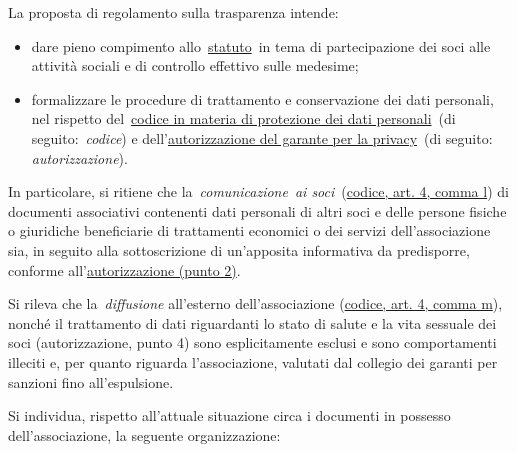 La proposta di regolamento sulla trasparenza intende:

\begin{itemize}
    \item
        dare pieno compimento
        allo~\href{http://www.alumniscuolagalileiana.it/wp-content/uploads/2017/03/Statuto-Alumni-SGSS.pdf}{statuto}~in
        tema di partecipazione dei soci alle attività sociali e di controllo
        effettivo sulle medesime;
    \item
        formalizzare le procedure di trattamento e conservazione dei dati
        personali, nel rispetto
        del~\href{http://www.garanteprivacy.it/web/guest/home/docweb/-/docweb-display/docweb/1311248}{codice
        in materia di protezione dei dati personali}~(di
        seguito:~\emph{codice}) e
        dell'\href{http://garanteprivacy.it/web/guest/home/docweb/-/docweb-display/docweb/5803310}{autorizzazione
        del garante per la privacy}~(di seguito: \emph{autorizzazione}).
\end{itemize}

In particolare, si ritiene che la~\emph{comunicazione}~\emph{ai
soci}~(\href{http://www.garanteprivacy.it/web/guest/home/docweb/-/docweb-display/docweb/1311248}{codice,
art. 4, comma l}) di documenti associativi contenenti dati personali di
altri soci e delle persone fisiche o giuridiche beneficiarie di
trattamenti economici o dei servizi dell'associazione sia, in seguito
alla sottoscrizione di un'apposita informativa da predisporre, conforme
all'\href{http://garanteprivacy.it/web/guest/home/docweb/-/docweb-display/docweb/5803310}{autorizzazione
(punto 2)}.

Si rileva che la~\emph{diffusione} all'esterno dell'associazione
(\href{http://www.garanteprivacy.it/web/guest/home/docweb/-/docweb-display/docweb/1311248}{codice,
art. 4, comma m}), nonché il trattamento di dati riguardanti lo stato di
salute e la vita sessuale dei soci (autorizzazione, punto 4) sono
esplicitamente esclusi e sono comportamenti illeciti e, per quanto
riguarda l'associazione, valutati dal collegio dei garanti per sanzioni
fino all'espulsione.

Si individua, rispetto all'attuale situazione circa i documenti in
possesso dell'associazione, la seguente organizzazione:

